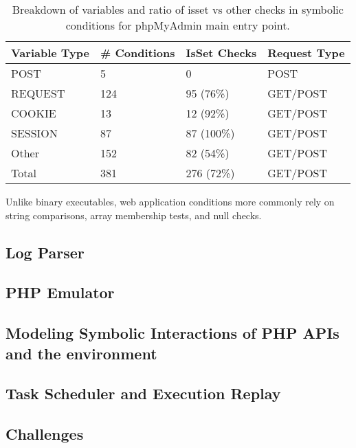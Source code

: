 \begin{table}[]
    \caption{Breakdown of variables and ratio of isset vs other checks in symbolic conditions for phpMyAdmin main entry point.}
    \label{tab:symbolicvars}
    \begin{tabular}{|l|l|l|l|}
    \hline
    \textbf{Variable Type} & \textbf{\# Conditions} & \textbf{IsSet Checks} & \textbf{Request Type} \\ \hline
    POST                   & 5                      & 0                     & POST                  \\ \hline
    REQUEST                & 124                    & 95 (76\%)             & GET/POST              \\ \hline
    COOKIE                 & 13                     & 12 (92\%)             & GET/POST              \\ \hline
    SESSION                & 87                     & 87 (100\%)            & GET/POST              \\ \hline
    Other                  & 152                    & 82 (54\%)             & GET/POST              \\ \hline
    Total                  & 381                    & 276 (72\%)            & GET/POST                      \\ \hline
    \end{tabular}
    \end{table}

Unlike binary executables, web application conditions more commonly rely on string comparisons, array membership tests, and null checks. 



\subsection{Log Parser}
\subsection{PHP Emulator}
\subsection{Modeling Symbolic Interactions of PHP APIs and the environment}
\subsection{Task Scheduler and Execution Replay}
\subsection{Challenges}

